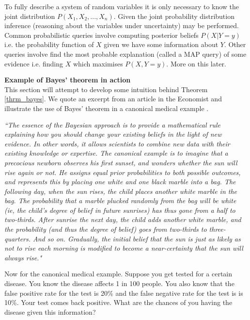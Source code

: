 To fully describe a system of random variables it is only necessary to know the joint distribution $P(X_1,X_2,...,X_n)$. Given the joint probability distribution inference (reasoning about the variables under uncertainty) may be performed. Common probabilistic queries involve computing posterior beliefs $P(X|Y=y)$ i.e. the probability function of $X$ given we have some information about $Y$. Other queries involve find the most probable explanation (called a MAP query) of some evidence i.e. finding $X$ which maximises $P(X, Y=y)$. More on this later. 

\textbf{Example of Bayes' theorem in action}\\
This section will attempt to develop some intuition behind Theorem \ref{thrm_bayes}. We quote an excerpt from an article in the Economist \cite{eco1} and illustrate the use of Bayes' theorem in a canonical medical example \cite{korb}.

\textit{``The essence of the Bayesian approach is to provide a mathematical rule explaining how you should change your existing beliefs in the light of new evidence. In other words, it allows scientists to combine new data with their existing knowledge or expertise. The canonical example is to imagine that a precocious newborn observes his first sunset, and wonders whether the sun will rise again or not. He assigns equal prior probabilities to both possible outcomes, and represents this by placing one white and one black marble into a bag. The following day, when the sun rises, the child places another white marble in the bag. The probability that a marble plucked randomly from the bag will be white (ie, the child's degree of belief in future sunrises) has thus gone from a half to two-thirds. After sunrise the next day, the child adds another white marble, and the probability (and thus the degree of belief) goes from two-thirds to three-quarters. And so on. Gradually, the initial belief that the sun is just as likely as not to rise each morning is modified to become a near-certainty that the sun will always rise."}

Now for the canonical medical example. Suppose you get tested for a certain disease. You know the disease affects 1 in 100 people. You also know that the false positive rate for the test is 20\% and the false negative rate for the test is is 10\%. Your test comes back positive. What are the chances of you having the disease given this information?


